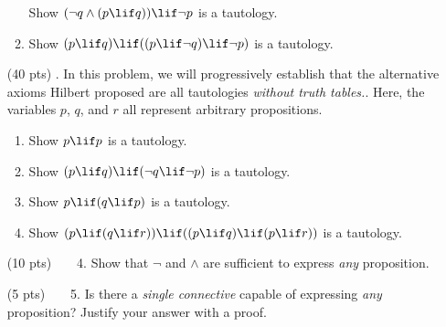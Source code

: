 \begin{enumerate}
\begin{enumerate}
        Show $(\neg q \land (p \lif q)) \lif \neg p$ is a tautology.
      \item
        Show $(p \lif q) \lif ((p \lif \neg q) \lif \neg p)$ is a tautology.
    \end{enumerate}
  \item[(40 pts) \quad 3.]
    In this problem, we will progressively establish that the alternative axioms Hilbert proposed are all tautologies \emph{without truth tables.}.
    Here, the variables $p$, $q$, and $r$ all represent arbitrary propositions.
    \begin{enumerate}
      \item
        Show $p \lif p$ is a tautology.
      \item
        Show $(p \lif q) \lif (\neg q \lif \neg p)$ is a tautology.
      \item
        Show $p \lif (q \lif p)$ is a tautology.
      \item
        Show $(p \lif (q \lif r)) \lif ((p \lif q) \lif (p \lif r))$ is a tautology.
    \end{enumerate}
  \item[(10 pts)~~~~4.]
    Show that $\neg$ and $\land$ are sufficient to express \emph{any} proposition.
  \item[(5 pts)~~~~5.]
    Is there a \emph{single connective} capable of expressing \emph{any} proposition?%
    Justify your answer with a proof.
\end{enumerate}


